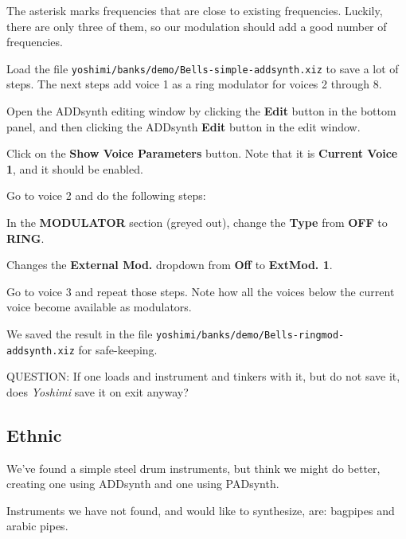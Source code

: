    The asterisk marks frequencies that are close to existing
   frequencies.   Luckily, there are only three of them, so our
   modulation should add a good number of frequencies.

   \begin{enumber}
      \item Load the file \texttt{yoshimi/banks/demo/Bells-simple-addsynth.xiz}
         to save a lot of steps.  The next steps add voice 1 as a ring
         modulator for voices 2 through 8.
      \item Open the ADDsynth editing window by clicking the \textbf{Edit}
         button in the bottom panel, and then clicking the ADDsynth
         \textbf{Edit} button in the edit window.
      \item Click on the \textbf{Show Voice Parameters} button.
         Note that it is \textbf{Current Voice 1}, and it should be enabled.
      \item Go to voice 2 and do the following steps:
         \begin{enumber}
            \item In the \textbf{MODULATOR} section (greyed out), change the
               \textbf{Type} from \textbf{OFF} to \textbf{RING}.
            \item Changes the \textbf{External Mod.} dropdown from
               \textbf{Off} to \textbf{ExtMod. 1}.
         \end{enumber}
      \item Go to voice 3 and repeat those steps.  Note how all the voices
         below the current voice become available as modulators.
   \end{enumber}

   We saved the result in the file
   \texttt{yoshimi/banks/demo/Bells-ringmod-addsynth.xiz} for safe-keeping.

   QUESTION:  If one loads and instrument and tinkers with it, but do not
   save it, does \textsl{Yoshimi} save it on exit anyway?

\subsection{Ethnic}
\label{subsec:cookbook_instruments_ethnic}

   We've found a simple steel drum instruments, but think we might do better,
   creating one using ADDsynth and one using PADsynth.

   Instruments we have not found, and would like to synthesize, are:
   bagpipes and arabic pipes.

